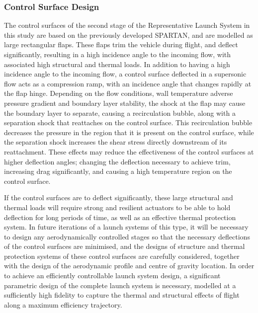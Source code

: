 \subsubsection{Control Surface Design} %
The control surfaces of the second stage of the Representative Launch System in this study are based on the previously developed SPARTAN\cite{Preller2017b}, and are modelled as large rectangular flaps. These flaps trim the vehicle during flight, and deflect significantly, resulting in a high incidence angle to the incoming flow, with associated high structural and thermal loads.
In addition to having a high incidence angle to the incoming flow, a control surface deflected in a supersonic flow acts as a compression ramp, with an incidence angle that changes rapidly at the flap hinge. Depending on the flow conditions, wall temperature adverse pressure gradient and boundary layer stability, the shock at the flap may cause the boundary layer to separate, causing a recirculation bubble, along with a separation shock that reattaches on the control surface\cite{Marini2001}. This recirculation bubble decreases the pressure in the region that it is present on the control surface, while the separation shock increases the shear stress directly downstream of its reattachment\cite{Marini2001}. These effects may reduce the effectiveness of the control surfaces at higher deflection angles; changing the deflection necessary to achieve trim, increasing drag significantly, and causing a high temperature region on the control surface. 

 If the control surfaces are to deflect significantly, these large structural and thermal loads will require strong and resilient actuators to be able to hold deflection for long periods of time, as well as an effective thermal protection system. 
In future iterations of a launch systems of this type, it will be necessary to design any aerodynamically controlled stages so that the necessary deflections of the control surfaces are minimised, and the designs of structure and thermal protection systems of these control surfaces are carefully considered, together with the design of the aerodynamic profile and centre of gravity location. In order to achieve an efficiently controllable launch system design, a significant parametric design of the complete launch system is necessary, modelled at a sufficiently high fidelity to capture the thermal and structural effects of flight along a maximum efficiency trajectory. 

